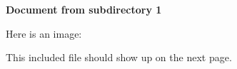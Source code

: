 \documentclass{article}
\begin{document}
\textbf{Document from subdirectory 1}

Here is an image:

This included file should show up on the next page.

\end{document}
